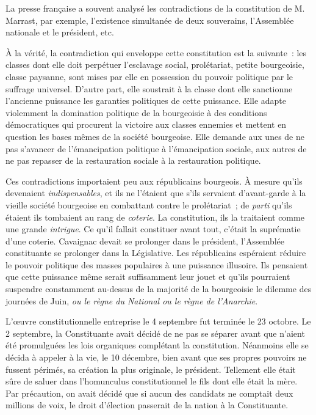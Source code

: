 \documentclass[twoside]{book} %
\begin{document}
La presse française a souvent analysé les contradictions de la constitution de M. Marrast, par exemple, l’existence simultanée de deux souverains, l’Assemblée nationale et le président, etc.\par
À la vérité, la contradiction qui enveloppe cette constitution est la suivante : les classes dont elle doit perpétuer l’esclavage social, prolétariat, petite bourgeoisie, classe paysanne, sont mises par elle en possession du pouvoir politique par le suffrage universel. D’autre part, elle soustrait à la classe dont elle sanctionne l’ancienne puissance les garanties politiques de cette puissance. Elle adapte violemment la domination politique de la bourgeoisie à des conditions démocratiques qui procurent la victoire aux classes ennemies et mettent en question les bases mêmes de la société bourgeoise. Elle demande aux unes de ne pas s’avancer de l’émancipation politique à l’émancipation sociale, aux autres de ne pas repasser de la restauration sociale à la restauration politique.\par
Ces contradictions importaient peu aux républicains bourgeois. À mesure qu’ils devenaient \emph{indispensables}, et ils ne l’étaient que s’ils servaient d’avant-garde à la vieille société bourgeoise en combattant contre le prolétariat ; de \emph{parti} qu’ils étaient ils tombaient au rang de \emph{coterie}. La constitution, ils la traitaient comme une grande \emph{intrigue}. Ce qu’il fallait constituer avant tout, c’était la suprématie d’une coterie. Cavaignac devait se prolonger dans le président, l’Assemblée constituante se prolonger dans la Législative. Les républicains espéraient réduire le pouvoir politique des masses populaires à une puissance illusoire. Ils pensaient que cette puissance même serait suffisamment leur jouet et qu’ils pourraient suspendre constamment au-dessus de la majorité de la bourgeoisie le dilemme des journées de Juin, \emph{ou le règne du National ou le règne de l’Anarchie}.\par
L’œuvre constitutionnelle entreprise le 4 septembre fut terminée le 23 octobre. Le 2 septembre, la Constituante avait décidé de ne pas se séparer avant que n’aient été promulguées les lois organiques complétant la constitution. Néanmoins elle se décida à appeler à la vie, le 10 décembre, bien avant que ses propres pouvoirs ne fussent périmés, sa création la plus originale, le président. Tellement elle était sûre de saluer dans l’homunculus constitutionnel le fils dont elle était la mère. Par précaution, on avait décidé que si aucun des candidats ne comptait deux millions de voix, le droit d’élection passerait de la nation à la Constituante.\par
\end{document}
